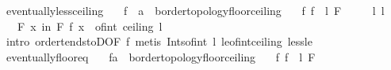 \begin{isabellebody}
\endisatagproof
{\isafoldproof}%
%
\isadelimproof
\isanewline
%
\endisadelimproof
\isanewline
{}\isamarkupfalse%
\ eventually{\isacharunderscore}{\kern0pt}less{\isacharunderscore}{\kern0pt}ceiling{\isacharcolon}{\kern0pt}\isanewline
\ \ \ f\ {\isacharcolon}{\kern0pt}{\isacharcolon}{\kern0pt}\ {\isachardoublequoteopen}{\isacharprime}{\kern0pt}a\ {\isasymRightarrow}\ {\isacharprime}{\kern0pt}b{\isacharcolon}{\kern0pt}{\isacharcolon}{\kern0pt}{\isacharbraceleft}{\kern0pt}order{\isacharunderscore}{\kern0pt}topology{\isacharcomma}{\kern0pt}floor{\isacharunderscore}{\kern0pt}ceiling{\isacharbraceright}{\kern0pt}{\isachardoublequoteclose}\isanewline
\ \ \ f{\isacharcolon}{\kern0pt}\ {\isachardoublequoteopen}{\isacharparenleft}{\kern0pt}f\ {\isasymlonglongrightarrow}\ l{\isacharparenright}{\kern0pt}\ F{\isachardoublequoteclose}\isanewline
\ \ \ \ \ l{\isacharcolon}{\kern0pt}\ {\isachardoublequoteopen}l\ {\isasymnotin}\ {\isasymint}{\isachardoublequoteclose}\isanewline
\ \ \ {\isachardoublequoteopen}{\isasymforall}\isactrlsub F\ x\ in\ F{\isachardot}{\kern0pt}\ f\ x\ {\isacharless}{\kern0pt}\ of{\isacharunderscore}{\kern0pt}int\ {\isacharparenleft}{\kern0pt}ceiling\ l{\isacharparenright}{\kern0pt}{\isachardoublequoteclose}\isanewline
%
\isadelimproof
\ \ %
\endisadelimproof
%
\isatagproof
{}\isamarkupfalse%
\ {\isacharparenleft}{\kern0pt}intro\ order{\isacharunderscore}{\kern0pt}tendstoD{\isacharbrackleft}{\kern0pt}OF\ f{\isacharbrackright}{\kern0pt}{\isacharparenright}{\kern0pt}\ {\isacharparenleft}{\kern0pt}metis\ Ints{\isacharunderscore}{\kern0pt}of{\isacharunderscore}{\kern0pt}int\ l\ le{\isacharunderscore}{\kern0pt}of{\isacharunderscore}{\kern0pt}int{\isacharunderscore}{\kern0pt}ceiling\ less{\isacharunderscore}{\kern0pt}le{\isacharparenright}{\kern0pt}%
\endisatagproof
{\isafoldproof}%
%
\isadelimproof
\isanewline
%
\endisadelimproof
\isanewline
{}\isamarkupfalse%
\ eventually{\isacharunderscore}{\kern0pt}floor{\isacharunderscore}{\kern0pt}eq{\isacharcolon}{\kern0pt}\isanewline
\ \ \ f{\isacharcolon}{\kern0pt}{\isacharcolon}{\kern0pt}{\isachardoublequoteopen}{\isacharprime}{\kern0pt}a\ {\isasymRightarrow}\ {\isacharprime}{\kern0pt}b{\isacharcolon}{\kern0pt}{\isacharcolon}{\kern0pt}{\isacharbraceleft}{\kern0pt}order{\isacharunderscore}{\kern0pt}topology{\isacharcomma}{\kern0pt}floor{\isacharunderscore}{\kern0pt}ceiling{\isacharbraceright}{\kern0pt}{\isachardoublequoteclose}\isanewline
\ \ \ f{\isacharcolon}{\kern0pt}\ {\isachardoublequoteopen}{\isacharparenleft}{\kern0pt}f\ {\isasymlonglongrightarrow}\ l{\isacharparenright}{\kern0pt}\ F{\isachardoublequoteclose}\isanewline

\end{isabellebody}
